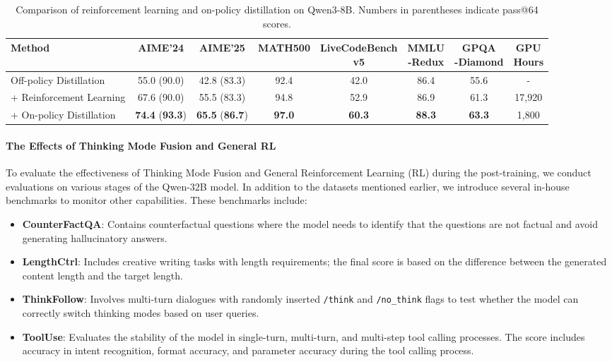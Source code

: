 \begin{table}[htbp]
\caption{Comparison of reinforcement learning and on-policy distillation on Qwen3-8B. Numbers in parentheses indicate pass@64 scores.}
\small
\centering
\setlength\tabcolsep{3pt}
\begin{tabular}{@{}lcccccc|c@{}} 
\toprule
Method & AIME'24 & AIME'25 & MATH500 & \tabincell{c}{LiveCodeBench\\v5} & \tabincell{c}{MMLU\\-Redux} & \tabincell{c}{GPQA\\-Diamond} & \tabincell{c}{GPU\\Hours}\\
\midrule
Off-policy Distillation & 55.0 (90.0) & 42.8 (83.3) & 92.4 & 42.0 & 86.4 & 55.6 & - \\
 + Reinforcement Learning & 67.6 (90.0) & 55.5 (83.3) & 94.8 & 52.9 & 86.9 & 61.3 & 17,920 \\
+ On-policy Distillation & \textbf{74.4} (\textbf{93.3}) & \textbf{65.5} (\textbf{86.7}) & \textbf{97.0} & \textbf{60.3} &  \textbf{88.3}  & \textbf{63.3} & 1,800 \\
\bottomrule
\end{tabular}
\label{tab:distillation}
\end{table}


\paragraph{The Effects of Thinking Mode Fusion and General RL}


To evaluate the effectiveness of Thinking Mode Fusion and General Reinforcement Learning (RL) during the post-training, we conduct evaluations on various stages of the Qwen-32B model. In addition to the datasets mentioned earlier, we introduce several in-house benchmarks to monitor other capabilities. These benchmarks include:

\begin{itemize}
    \item \textbf{CounterFactQA}: Contains counterfactual questions where the model needs to identify that the questions are not factual and avoid generating hallucinatory answers.
    \item \textbf{LengthCtrl}: Includes creative writing tasks with length requirements; the final score is based on the difference between the generated content length and the target length.
    \item \textbf{ThinkFollow}: Involves multi-turn dialogues with randomly inserted \texttt{/think} and \texttt{/no\_think} flags to test whether the model can correctly switch thinking modes based on user queries.
    \item \textbf{ToolUse}: Evaluates the stability of the model in single-turn, multi-turn, and multi-step tool calling processes. The score includes accuracy in intent recognition, format accuracy, and parameter accuracy during the tool calling process.
\end{itemize}


